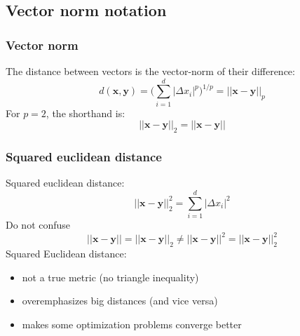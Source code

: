 \documentclass[Nike]{tuberlinbeamer}
\newcommand{\x}{\boldsymbol{x}}
\newcommand{\y}{\boldsymbol{y}}
\begin{document}
\subsection{Vector norm notation}
\begin{frame}
  \frametitle{Vector norm}
  The distance between vectors is the vector-norm of their difference:
  \begin{equation*}
    d(\x, \y) = \Bigg(\sum_{i=1}^d |\Delta x_i|^p\Bigg)^{1/p} = ||\x - \y||_p
  \end{equation*}
  \pause
  For $p=2$, the shorthand is:
  \begin{equation*}
    ||\x - \y||_2 = ||\x - \y||
  \end{equation*}
\end{frame}


\begin{frame}
  \frametitle{Squared euclidean distance}
  Squared euclidean distance:
  \begin{equation*}
    ||\x - \y||_2^2 = \sum_{i=1}^d |\Delta x_i|^2
  \end{equation*}
  \pause
  Do not confuse
  \begin{equation*}
    ||\x - \y|| = ||\x - \y||_2 \neq ||\x - \y||^2 = ||\x - \y||_2^2
  \end{equation*}
  \pause
  Squared Euclidean distance:
  \begin{itemize}
    \item not a true metric (no triangle inequality)
    \item overemphasizes big distances (and vice versa)
    \item makes some optimization problems converge better
  \end{itemize}
\end{frame}
\end{document}
